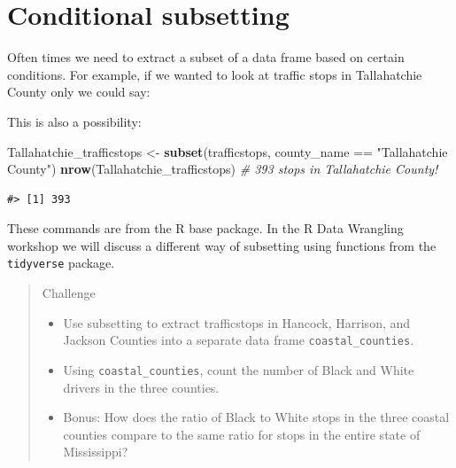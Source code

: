 \documentclass[]{book}
\newenvironment{Shaded}{\begin{snugshade}}{\end{snugshade}}
\newcommand{\KeywordTok}[1]{\textcolor[rgb]{0.13,0.29,0.53}{\textbf{{#1}}}}
\newcommand{\StringTok}[1]{\textcolor[rgb]{0.31,0.60,0.02}{{#1}}}
\newcommand{\CommentTok}[1]{\textcolor[rgb]{0.56,0.35,0.01}{\textit{{#1}}}}
\newcommand{\NormalTok}[1]{{#1}}
\providecommand{\tightlist}{%
  \setlength{\itemsep}{0pt}\setlength{\parskip}{0pt}}
\theoremstyle{definition}
\theoremstyle{definition}
\theoremstyle{remark}
\begin{document}
\section{Conditional subsetting}\label{conditional-subsetting-1}

Often times we need to extract a subset of a data frame based on certain
conditions. For example, if we wanted to look at traffic stops in
Tallahatchie County only we could say:

\begin{Shaded}
\end{Shaded}

This is also a possibility:

\begin{Shaded}
\begin{Highlighting}[]
\NormalTok{Tallahatchie_trafficstops <-}\StringTok{ }\KeywordTok{subset}\NormalTok{(trafficstops, county_name ==}\StringTok{ "Tallahatchie County"}\NormalTok{)}
\KeywordTok{nrow}\NormalTok{(Tallahatchie_trafficstops) }\CommentTok{# 393 stops in Tallahatchie County!}
\end{Highlighting}
\end{Shaded}

\begin{verbatim}
#> [1] 393
\end{verbatim}

These commands are from the R base package. In the R Data Wrangling
workshop we will discuss a different way of subsetting using functions
from the \texttt{tidyverse} package.

\begin{quote}
Challenge

\begin{itemize}
\tightlist
\item
  Use subsetting to extract trafficstops in Hancock, Harrison, and
  Jackson Counties into a separate data frame
  \texttt{coastal\_counties}.
\item
  Using \texttt{coastal\_counties}, count the number of Black and White
  drivers in the three counties.
\item
  Bonus: How does the ratio of Black to White stops in the three coastal
  counties compare to the same ratio for stops in the entire state of
  Mississippi?
\end{itemize}
\end{quote}
\end{document}

